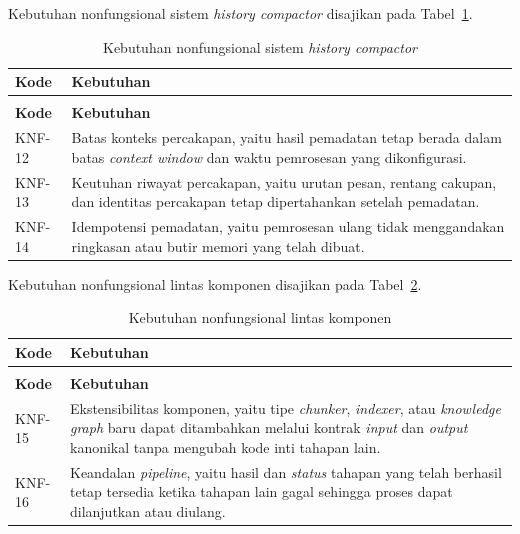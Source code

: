 \noindent Kebutuhan nonfungsional sistem \emph{history compactor} disajikan pada Tabel~\ref{tab:knf-history-compactor}.

\begin{longtable}{>{\RaggedRight\arraybackslash}p{2.2cm} >{\RaggedRight\arraybackslash}p{10.65cm}}
    \caption{Kebutuhan nonfungsional sistem \emph{history compactor}}\label{tab:knf-history-compactor}\\
    \toprule
    \textbf{Kode} & \textbf{Kebutuhan}\\
    \midrule
    \endfirsthead
    \multicolumn{2}{l}{\small\itshape Lanjutan Tabel \ref{tab:knf-history-compactor}}\\
    \toprule
    \textbf{Kode} & \textbf{Kebutuhan}\\
    \midrule
    \endhead
    \bottomrule
    \endfoot
    KNF-12 & Batas konteks percakapan, yaitu hasil pemadatan tetap berada dalam batas \emph{context window} dan waktu pemrosesan yang dikonfigurasi.\\
    KNF-13 & Keutuhan riwayat percakapan, yaitu urutan pesan, rentang cakupan, dan identitas percakapan tetap dipertahankan setelah pemadatan.\\
    KNF-14 & Idempotensi pemadatan, yaitu pemrosesan ulang tidak menggandakan ringkasan atau butir memori yang telah dibuat.\\
\end{longtable}

\noindent Kebutuhan nonfungsional lintas komponen disajikan pada Tabel~\ref{tab:knf-lintas-komponen}.

\begin{longtable}{>{\RaggedRight\arraybackslash}p{2.2cm} >{\RaggedRight\arraybackslash}p{10.65cm}}
    \caption{Kebutuhan nonfungsional lintas komponen}\label{tab:knf-lintas-komponen}\\
    \toprule
    \textbf{Kode} & \textbf{Kebutuhan}\\
    \midrule
    \endfirsthead
    \multicolumn{2}{l}{\small\itshape Lanjutan Tabel \ref{tab:knf-lintas-komponen}}\\
    \toprule
    \textbf{Kode} & \textbf{Kebutuhan}\\
    \midrule
    \endhead
    \bottomrule
    \endfoot
    KNF-15 & Ekstensibilitas komponen, yaitu tipe \emph{chunker}, \emph{indexer}, atau \emph{knowledge graph} baru dapat ditambahkan melalui kontrak \emph{input} dan \emph{output} kanonikal tanpa mengubah kode inti tahapan lain.\\
    KNF-16 & Keandalan \emph{pipeline}, yaitu hasil dan \emph{status} tahapan yang telah berhasil tetap tersedia ketika tahapan lain gagal sehingga proses dapat dilanjutkan atau diulang.\\
\end{longtable}

